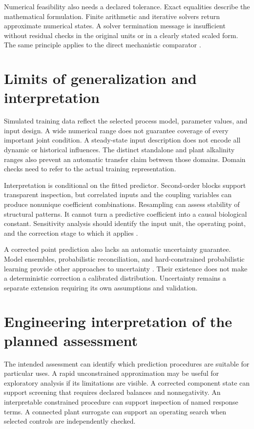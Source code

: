 Numerical feasibility also needs a declared tolerance. Exact equalities describe the mathematical formulation. Finite arithmetic and iterative solvers return approximate numerical states. A solver termination message is insufficient without residual checks in the original units or in a clearly stated scaled form. The same principle applies to the direct mechanistic comparator \citep{Boyd2004,BuzziFerraris2013}.

\section{Limits of generalization and interpretation}

Simulated training data reflect the selected process model, parameter values, and input design. A wide numerical range does not guarantee coverage of every important joint condition. A steady-state input description does not encode all dynamic or historical influences. The distinct standalone and plant alkalinity ranges also prevent an automatic transfer claim between those domains. Domain checks need to refer to the actual training representation.

Interpretation is conditional on the fitted predictor. Second-order blocks support transparent inspection, but correlated inputs and the coupling variables can produce nonunique coefficient combinations. Resampling can assess stability of structural patterns. It cannot turn a predictive coefficient into a causal biological constant. Sensitivity analysis should identify the input unit, the operating point, and the correction stage to which it applies \citep{Machado2014,Brunton2016}.

A corrected point prediction also lacks an automatic uncertainty guarantee. Model ensembles, probabilistic reconciliation, and hard-constrained probabilistic learning provide other approaches to uncertainty \citep{Lakshminarayanan2017,Hansen2024,Utkarsh2025}. Their existence does not make a deterministic correction a calibrated distribution. Uncertainty remains a separate extension requiring its own assumptions and validation.

\section{Engineering interpretation of the planned assessment}

The intended assessment can identify which prediction procedures are suitable for particular uses. A rapid unconstrained approximation may be useful for exploratory analysis if its limitations are visible. A corrected component state can support screening that requires declared balances and nonnegativity. An interpretable constrained procedure can support inspection of named response terms. A connected plant surrogate can support an operating search when selected controls are independently checked.

